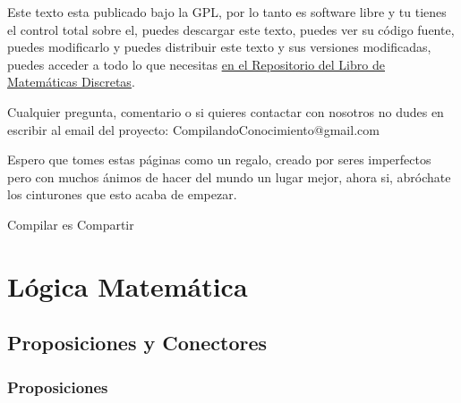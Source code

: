 \documentclass[12pt, fleqn]{report}                             %
\theoremstyle{break}                                            %
\begin{document}
    Este texto esta publicado bajo la GPL, por lo tanto es software libre y tu tienes el control total sobre
    el, puedes descargar este texto, puedes ver su código fuente, puedes modificarlo y puedes distribuir este
    texto y sus versiones modificadas, puedes acceder a todo lo que necesitas 
    \href{http://www.github.com/CompilandoConocimiento/LibroMatematicasDiscretas}
    {\underline{en el Repositorio del Libro de Matemáticas Discretas}}. 

    Cualquier pregunta, comentario o si quieres contactar con nosotros no dudes en escribir al email del proyecto:
    CompilandoConocimiento@gmail.com

    Espero que tomes estas páginas como un regalo, creado por seres imperfectos pero con muchos ánimos de hacer
    del mundo un lugar mejor, ahora si, abróchate los cinturones que esto acaba de empezar.

    \begin{flushright}
        Compilar es Compartir
    \end{flushright}


\part{Lógica Matemática}



    \chapter{Proposiciones y Conectores}
        \clearpage




        \section{Proposiciones}
\end{document}
